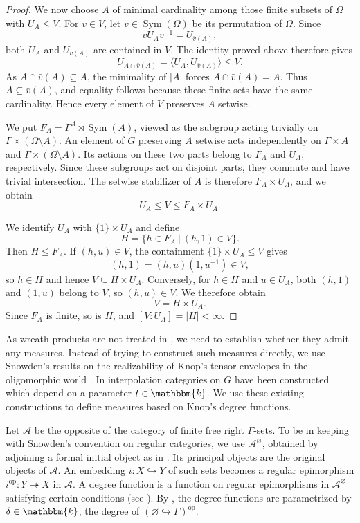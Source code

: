 \documentclass[11pt,a4paper]{amsart}
\theoremstyle{plain}%
\theoremstyle{definition}
\theoremstyle{remark}
\newcommand{\kk}{\mathbbm{k}}
\begin{document}
\begin{proof}
We now choose $A$ of minimal cardinality among those finite subsets of $\Omega$ with $U_A\leq V$. For $v\in V$,
let $\bar v \in \operatorname{Sym}(\Omega)$ be its permutation of $\Omega$. Since
\[
  vU_Av^{-1}=U_{\bar v(A)},
\]
both $U_A$ and $U_{\bar v(A)}$ are contained in $V$. The identity
proved above therefore gives
\[
  U_{A\cap\bar v(A)}
  =\langle U_A,U_{\bar v(A)}\rangle
  \leq V.
\]
As $A\cap\bar v(A)\subseteq A$, the minimality of $|A|$ forces
$A\cap\bar v(A)=A$. Thus $A\subseteq\bar v(A)$, and equality
follows because these finite sets have the same cardinality.
Hence every element of $V$ preserves $A$ setwise.

We put $F_A=\Gamma^A\rtimes\operatorname{Sym}(A)$, viewed as the
subgroup acting trivially on $\Gamma\times(\Omega\setminus A)$.
An element of $G$ preserving $A$ setwise acts independently on
$\Gamma\times A$ and $\Gamma\times(\Omega\setminus A)$.
Its actions on these two parts belong to $F_A$ and $U_A$,
respectively. Since these subgroups act on disjoint parts,
they commute and have trivial intersection. The setwise
stabilizer of $A$ is therefore $F_A\times U_A$, and we obtain
\[
  U_A\leq V\leq F_A\times U_A.
\]

We identify $U_A$ with $\{1\}\times U_A$ and define
\[
  H=\{h\in F_A \ | \ (h,1)\in V\}.
\]
Then $H\leq F_A$. If $(h,u)\in V$, the containment
$\{1\}\times U_A\leq V$ gives
\[
  (h,1)=(h,u)(1,u^{-1})\in V,
\]
so $h\in H$ and hence $V\subseteq H\times U_A$.
Conversely, for $h\in H$ and $u\in U_A$, both $(h,1)$ and
$(1,u)$ belong to $V$, so $(h,u)\in V$.
We therefore obtain
\[
  V=H\times U_A.
\]
Since $F_A$ is finite, so is $H$, and
$[V:U_A]=|H|<\infty$.

\end{proof}


As wreath products are not treated in \cite{HS-oligomorphic}, we need to establish whether they admit any measures. Instead of trying to construct such measures directly, we use Snowden's results on the realizability of Knop's tensor envelopes in the oligomorphic world \cite{Knop,Snowden-Knop}. In \cite{Knop,Nyobe-Savage} interpolation categories on $G$ have been constructed which depend on a parameter $t \in \kk$. We use these existing constructions to define measures based on Knop's degree functions. 

Let $\mathcal A$ be the opposite of the category of finite free right $\Gamma$-sets. To be in keeping with Snowden's convention on regular
categories, we use $\mathcal A^\varnothing$, obtained by adjoining
a formal initial object as in \cite[Definition~2.2]{Knop}. Its principal objects are the original objects of
$\mathcal A$. An embedding $i:X\hookrightarrow Y$ of such sets becomes a
regular epimorphism $i^{\mathrm{op}}:Y\twoheadrightarrow X$ in
$\mathcal A$. A degree function is a function on regular epimorphisms in $\mathcal{A}^\varnothing$ satisfying certain conditions (see \cite[Definition 3.1]{Knop}). By \cite[\S8, Example~2, equation~(8.15)]{Knop},
the degree functions are parametrized by $\delta\in\kk$, the
degree of $(\varnothing\hookrightarrow\Gamma)^{\mathrm{op}}$.
\end{document}
